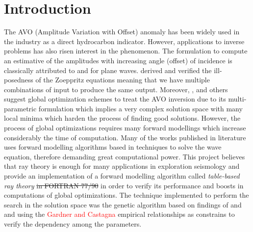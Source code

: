\documentclass{vie16}
\newcommand{\old}[1]{\textcolor{MyDarkViolet}{\sout{#1}}}
\newcommand{\att}[1]{\textcolor{red}{#1}}
\begin{document}
\section{Introduction}
The AVO (Amplitude Variation with Offset) anomaly has been widely used in 
the industry as a direct hydrocarbon indicator. However, applications to 
inverse problems has also risen interest in the phenomenon. The 
formulation to compute an estimative of the amplitudes with increasing 
angle (offset) of incidence is classically attributed to \cite{Zoeppritz1919} 
and \cite{Knott1899} for plane waves. \cite{Rosa1976} derived and verified 
the ill-posedness of the Zoeppritz equations meaning that we have multiple  
combinations of input to produce the same output.  Moreover, 
\cite{Stoffa1991}, \cite{Mallick1995} and others suggest global optimization 
schemes to treat the AVO inversion due to its multi-parametric formulation 
which implies a very complex solution space with many local minima which 
harden the process of finding good solutions. However, the process of 
global optimizations requires many forward modellings which increase 
considerably the time of computation. Many of the works published in 
literature uses forward modelling algorithms based in techniques to solve 
the wave equation, therefore demanding great computational power. This 
project believes that ray theory is enough for many applications in 
exploration seismology and provide an implementation of a forward 
modelling algorithm called \textit{table-based ray theory} \old{in FORTRAN 
77/90} in order to verify its performance and boosts in computations of 
global optimizations. The technique implemented to perform the search in 
the solution space was the genetic algorithm based on findings of 
\cite{Stoffa1991} and \cite{Sen1992} and using the \att{Gardner and 
Castagna} empirical relationships as constrains to verify the dependency 
among the parameters.
\end{document}
